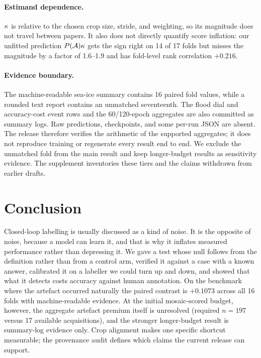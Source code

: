 \paragraph{Estimand dependence.} $\kappa$ is relative to the chosen crop size, stride,
and weighting, so its magnitude does not travel between papers. It also does not
directly quantify score inflation: our unfitted prediction $P(\mathcal{A})\kappa$ gets the sign
right on 14 of 17 folds but misses the magnitude by a factor of 1.6--1.9 and has
fold-level rank correlation $+0.216$.

\paragraph{Evidence boundary.} The machine-readable sea-ice summary contains 16
paired fold values, while a rounded text report contains an unmatched seventeenth.
The flood dial and accuracy-cost event rows and the 60/120-epoch aggregates are also
committed as summary logs. Raw predictions, checkpoints, and some per-run JSON are
absent. The release therefore verifies the arithmetic of the supported aggregates;
it does not reproduce training or regenerate every result end to end. We exclude the
unmatched fold from the main result and keep longer-budget results as sensitivity
evidence. The supplement inventories these tiers and the claims withdrawn from
earlier drafts.

\section{Conclusion}

Closed-loop labelling is usually discussed as a kind of noise. It is the opposite of
noise, because a model can learn it, and that is why it inflates measured performance
rather than depressing it. We gave a test whose null follows from the definition
rather than from a control arm, verified it against a case with a known answer,
calibrated it on a labeller we could turn up and down, and showed that what it detects
costs accuracy against human annotation. On the benchmark where the artefact occurred
naturally the paired contrast is $+0.1073$ across all 16 folds with machine-readable
evidence. At the initial mosaic-scored budget, however, the aggregate artefact
premium itself is unresolved (required $n=197$ versus 17 available acquisitions),
and the stronger longer-budget result is summary-log evidence only. Crop alignment
makes one specific shortcut measurable; the provenance audit defines which claims
the current release can support.
